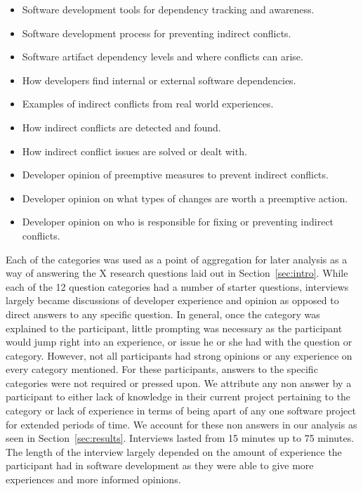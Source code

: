 \documentclass[conference]{IEEEtran}
\begin{document}
\begin{itemize}
\item Software development tools for dependency tracking and awareness.
\item Software development process for preventing indirect conflicts.
\item Software artifact dependency levels and where conflicts can arise.
\item How developers find internal or external software dependencies.
\item Examples of indirect conflicts from real world experiences.
\item How indirect conflicts are detected and found.
\item How indirect conflict issues are solved or dealt with.
\item Developer opinion of preemptive measures to prevent indirect conflicts.
\item Developer opinion on what types of changes are worth a preemptive action.
\item Developer opinion on who is responsible for fixing or preventing indirect conflicts.
\end{itemize}

Each of the categories was used as a
point of aggregation for later analysis as a way of answering the X research questions laid out in 
Section~\ref{sec:intro}. While each of the 12 question categories had a number of starter questions, interviews 
largely became discussions of developer experience and opinion as opposed to direct answers to any specific question.
In general, once the category was explained to the participant, little prompting was necessary as the participant
would jump right into an experience, or issue he or she had with the question or category. However, not all
participants had strong opinions or any experience on every category mentioned. For these participants, answers 
to the specific categories were not required or pressed upon. We attribute any non answer by a participant to
either lack of knowledge in their current project pertaining to the category or lack of experience in terms of
being apart of any one software project for extended periods of time. We account for these non answers
in our analysis as seen in Section~\ref{sec:results}. Interviews lasted 
from 15 minutes up to 75 minutes. The length of the interview largely depended on the amount of experience the
participant had in software development as they were able to give more experiences and more informed opinions.
\end{document}
